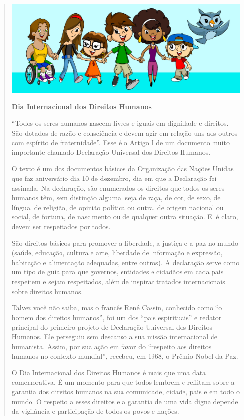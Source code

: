 \begin{conteudo}
\begin{conteudo}
\begin{conteudo}
\begin{conteudo}
\begin{quote}
\includegraphics[width=\textwidth]{media/image28.jpeg}

\textbf{Dia Internacional dos Direitos Humanos}


``Todos os seres humanos nascem livres e iguais em dignidade e
direitos. São dotados de razão e consciência e devem agir em relação
uns aos outros com espírito de fraternidade''. Esse é o Artigo I de um
documento muito importante chamado Declaração Universal dos Direitos
Humanos.

O texto é um dos documentos básicos da Organização das Nações Unidas que
faz aniversário dia 10 de dezembro, dia em que a Declaração foi
assinada. Na declaração, são enumerados os direitos que todos os seres
humanos têm, sem distinção alguma, seja de raça, de cor, de sexo, de
língua, de religião, de opinião política ou outra, de origem nacional ou
social, de fortuna, de nascimento ou de qualquer outra situação. E, é
claro, devem ser respeitados por todos.

São direitos básicos para promover a liberdade, a justiça e a paz no
mundo (saúde, educação, cultura e arte, liberdade de informação e
expressão, habitação e alimentação adequadas, entre outros). A
declaração serve como um tipo de guia para que governos, entidades e
cidadãos em cada país respeitem e sejam respeitados, além de inspirar
tratados internacionais sobre direitos humanos.

Talvez você não saiba, mas o francês René Cassin, conhecido como ``o
homem dos direitos humanos'', foi um dos ``pais espirituais'' e redator
principal do primeiro projeto de Declaração Universal dos Direitos
Humanos. Ele perseguiu sem descanso a sua missão internacional de
humanista. Assim, por sua ação em favor do ``respeito aos direitos
humanos no contexto mundial'', recebeu, em 1968, o Prêmio Nobel da Paz.

O Dia Internacional dos Direitos Humanos é mais que uma data
comemorativa. É um momento para que todos lembrem e reflitam sobre a
garantia dos direitos humanos na sua comunidade, cidade, país e em todo
o mundo. O respeito a esses direitos e a garantia de uma vida digna
depende da vigilância e participação de todos os povos e nações.


\end{quote}
\end{conteudo}
\end{conteudo}
\end{conteudo}
\end{conteudo}
